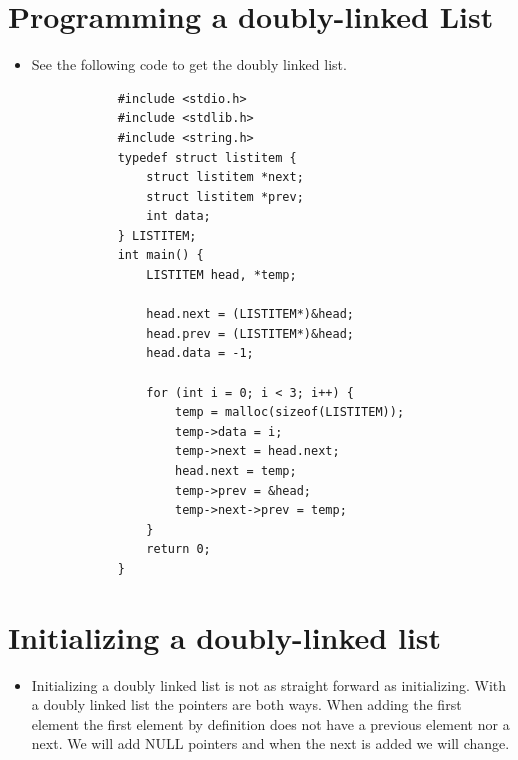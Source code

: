 \section{Programming a doubly-linked List}
\begin{itemize}
    \item See the following code to get the doubly linked list.
        \begin{verbatim}
            #include <stdio.h>
            #include <stdlib.h>
            #include <string.h>
            typedef struct listitem {
                struct listitem *next;
                struct listitem *prev;
                int data;
            } LISTITEM;
            int main() {
                LISTITEM head, *temp;

                head.next = (LISTITEM*)&head;
                head.prev = (LISTITEM*)&head;
                head.data = -1;
                
                for (int i = 0; i < 3; i++) {
                    temp = malloc(sizeof(LISTITEM));
                    temp->data = i;
                    temp->next = head.next;
                    head.next = temp;
                    temp->prev = &head;
                    temp->next->prev = temp;
                }
                return 0;
            }
        \end{verbatim}
\end{itemize}

\section{Initializing a doubly-linked list}
\begin{itemize}
    \item Initializing a doubly linked list is not as straight forward as initializing. With a doubly linked list the pointers are both ways. When adding the first element the first element by definition does not have a previous element nor a next. We will add NULL pointers and when the next is added we will change.
\end{itemize}

